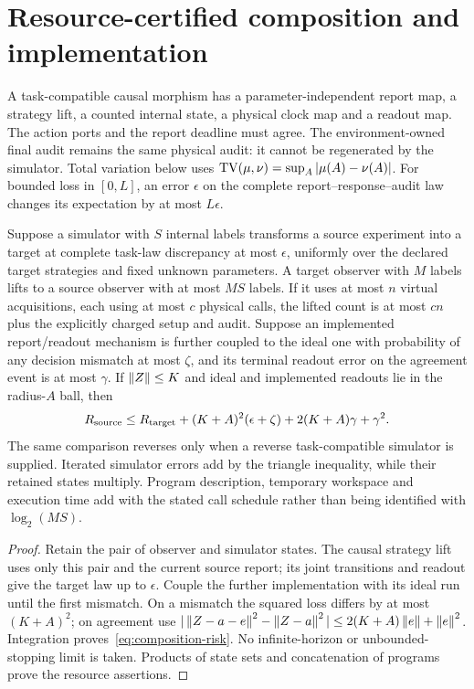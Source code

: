 \section{Resource-certified composition and implementation}\label{sec:composition}
A task-compatible causal morphism has a parameter-independent report map, a strategy lift, a counted internal state, a physical clock map and a readout map. The action ports and the report deadline must agree. The environment-owned final audit remains the same physical audit: it cannot be regenerated by the simulator. Total variation below uses $\operatorname{TV}(\mu,\nu)=\sup_A|\mu(A)-\nu(A)|$. For bounded loss in $[0,L]$, an error $\epsilon$ on the complete report--response--audit law changes its expectation by at most $L\epsilon$.

\begin{proposition}\label{prop:composition}
Suppose a simulator with $S$ internal labels transforms a source experiment into a target at complete task-law discrepancy at most $\epsilon$, uniformly over the declared target strategies and fixed unknown parameters. A target observer with $M$ labels lifts to a source observer with at most $MS$ labels. If it uses at most $n$ virtual acquisitions, each using at most $c$ physical calls, the lifted count is at most $cn$ plus the explicitly charged setup and audit. Suppose an implemented report/readout mechanism is further coupled to the ideal one with probability of any decision mismatch at most $\zeta$, and its terminal readout error on the agreement event is at most $\gamma$. If $\left\lVert Z\right\rVert\le K$ and ideal and implemented readouts lie in the radius-$A$ ball, then
\begin{equation}\label{eq:composition-risk}
 R_{\rm source}\le R_{\rm target}+(K+A)^2(\epsilon+\zeta)+2(K+A)\gamma+\gamma^2.
\end{equation}
The same comparison reverses only when a reverse task-compatible simulator is supplied. Iterated simulator errors add by the triangle inequality, while their retained states multiply. Program description, temporary workspace and execution time add with the stated call schedule rather than being identified with $\log_2(MS)$.
\end{proposition}
\begin{proof}
Retain the pair of observer and simulator states. The causal strategy lift uses only this pair and the current source report; its joint transitions and readout give the target law up to $\epsilon$. Couple the further implementation with its ideal run until the first mismatch. On a mismatch the squared loss differs by at most $(K+A)^2$; on agreement use
$|\left\lVert Z-a-e\right\rVert^2-\left\lVert Z-a\right\rVert^2|\le2(K+A)\left\lVert e\right\rVert+\left\lVert e\right\rVert^2$.
Integration proves~\eqref{eq:composition-risk}. No infinite-horizon or unbounded-stopping limit is taken. Products of state sets and concatenation of programs prove the resource assertions.
\end{proof}


